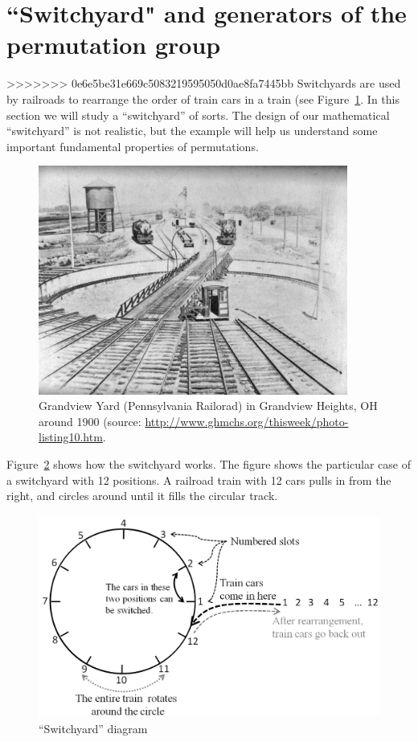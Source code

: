 \section{``Switchyard" and generators of the permutation group\quad
{}}
>>>>>>> 0e6e5be31e669c5083219595050d0ae8fa7445bb
Switchyards are used by railroads to rearrange the order of train cars in a train (see Figure~\ref{fig:grandview}. In this section we will study a ``switchyard'' of sorts. The design of our mathematical ``switchyard'' is not realistic, but the example will help us understand some important fundamental properties of permutations.
\begin{figure}[ht]
\begin{center}
\includegraphics[width=4in]{images/GrandviewYard.jpg}
\caption{Grandview Yard (Pennsylvania Railorad) in Grandview Heights, OH around 1900 (source: \url{http://www.ghmchs.org/thisweek/photo-listing10.htm}. }\label{fig:grandview}
\end{center}
\end{figure}

Figure~\ref{fig:switchyard} shows how the switchyard works. The figure shows the particular case of a switchyard with 12 positions. A railroad train with 12 cars pulls in from the right, and circles around until it fills the circular track. 
\begin{figure}[ht]
\begin{center}
\includegraphics[width=4.5in]{images/switchyard.png}
\caption{``Switchyard'' diagram}\label{fig:switchyard}
\end{center}
\end{figure}

